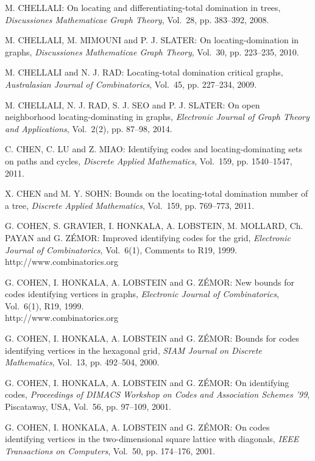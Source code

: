 \begin{thebibliography}{999}
M. CHELLALI: On locating and differentiating-total domination in trees, {\it Discussiones Mathematicae Graph Theory}, Vol.~28, pp. 383--392, 2008.

M. CHELLALI, M. MIMOUNI and P. J. SLATER: On locating-domination in graphs, {\it Discussiones Mathematicae Graph Theory}, Vol.~30, pp. 223--235, 2010.

M. CHELLALI and N. J. RAD: Locating-total domination critical graphs, {\it Australasian Journal of Combinatorics}, Vol.~45, pp. 227--234, 2009.

M. CHELLALI, N. J. RAD, S. J. SEO and P. J. SLATER: On open neighborhood locating-dominating in graphs, {\it Electronic Journal of Graph Theory and Applications}, Vol.~2(2), pp. 87--98, 2014.

C. CHEN, C. LU and Z. MIAO: Identifying codes and locating-dominating sets on paths and cycles, {\it Discrete Applied Mathematics}, Vol.~159, pp. 1540--1547, 2011.

X. CHEN and M. Y. SOHN: Bounds on the locating-total domination number of a tree, {\it Discrete Applied Mathematics}, Vol.~159, pp. 769--773, 2011.

G. COHEN, S. GRAVIER, I. HONKALA, A. LOBSTEIN, M. MOLLARD, Ch. PAYAN and G. Z\'EMOR: Improved identifying codes for the grid, {\it Electronic Journal of Combinatorics}, Vol.~6(1), Comments to R19, 1999.\\
http://www.combinatorics.org

G. COHEN, I. HONKALA, A. LOBSTEIN and G. Z\'EMOR: New bounds for codes identifying vertices in graphs, {\it Electronic Journal of Combinatorics}, Vol.~6(1), R19, 1999.\\
http://www.combinatorics.org

G. COHEN, I. HONKALA, A. LOBSTEIN and G. Z\'EMOR: Bounds for codes identifying vertices in the hexagonal grid, {\it SIAM Journal on Discrete Mathematics}, Vol.~13, pp. 492--504, 2000.

G. COHEN, I. HONKALA, A. LOBSTEIN and G. Z\'EMOR: On identifying codes, {\it Proceedings of DIMACS Workshop on Codes and Association Schemes '99}, Piscataway, USA, Vol.~56, pp. 97--109, 2001.

G. COHEN, I. HONKALA, A. LOBSTEIN and G. Z\'EMOR: On codes identifying vertices in the two-dimensional square lattice with diagonals, {\it IEEE Transactions on Computers}, Vol.~50, pp. 174--176, 2001.


\end{thebibliography}
